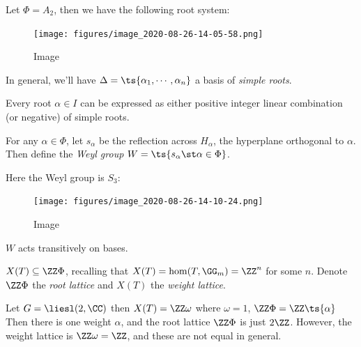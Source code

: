 \begin{example}

Let \(\Phi = A_2\), then we have the following root system:

\begin{figure}
\centering
\texttt{[image: figures/image\_2020-08-26-14-05-58.png]}
\caption{Image}
\end{figure}

\end{example}

In general, we'll have \(\Delta = \ts{\alpha_1, \cdots, \alpha_n}\) a
basis of \emph{simple roots}.

\begin{remark}

Every root \(\alpha\in I\) can be expressed as either positive integer
linear combination (or negative) of simple roots.

\end{remark}

For any \(\alpha\in \Phi\), let \(s_\alpha\) be the reflection across
\(H_\alpha\), the hyperplane orthogonal to \(\alpha\). Then define the
\emph{Weyl group} \(W = \ts{s_\alpha \st \alpha\in \Phi}\).

\begin{example}

Here the Weyl group is \(S_3\):

\begin{figure}
\centering
\texttt{[image: figures/image\_2020-08-26-14-10-24.png]}
\caption{Image}
\end{figure}

\end{example}

\begin{remark}

\(W\) acts transitively on bases.

\end{remark}

\begin{remark}

\(X(T) \subseteq \ZZ\Phi\), recalling that
\(X(T) = \hom(T, \GG_m) = \ZZ^n\) for some \(n\). Denote \(\ZZ\Phi\) the
\emph{root lattice} and \(X(T)\) the \emph{weight lattice}.

\end{remark}

\begin{example}

Let \(G = \liesl(2, \CC)\) then \(X(T) = \ZZ\omega\) where
\(\omega = 1\), \(\ZZ \Phi = \ZZ\ts{\alpha}\) Then there is one weight
\(\alpha\), and the root lattice \(\ZZ\Phi\) is just \(2\ZZ\). However,
the weight lattice is \(\ZZ\omega = \ZZ\), and these are not equal in
general.

\end{example}

